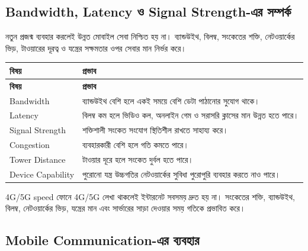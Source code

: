 \subsection{Bandwidth, Latency ও Signal Strength-এর সম্পর্ক}

নতুন প্রজন্ম ব্যবহার করলেই উন্নত মোবাইল সেবা নিশ্চিত হয় না। ব্যান্ডউইথ, বিলম্ব, সংকেতের শক্তি, নেটওয়ার্কের ভিড়, টাওয়ারের দূরত্ব ও যন্ত্রের সক্ষমতার ওপর সেবার মান নির্ভর করে।

\begingroup
\begin{longtable}{|p{}|p{}|}
\hline
\textbf{বিষয়} & \textbf{প্রভাব} \\
\hline
\endfirsthead
\hline
\textbf{বিষয়} & \textbf{প্রভাব} \\
\hline
\endhead

Bandwidth & ব্যান্ডউইথ বেশি হলে একই সময়ে বেশি ডেটা পাঠানোর সুযোগ থাকে। \\
\hline
Latency & বিলম্ব কম হলে ভিডিও কল, অনলাইন গেম ও সরাসরি ক্লাসের মান উন্নত হতে পারে। \\
\hline
Signal Strength & শক্তিশালী সংকেত সংযোগ স্থিতিশীল রাখতে সাহায্য করে। \\
\hline
Congestion & ব্যবহারকারী বেশি হলে গতি কমতে পারে। \\
\hline
Tower Distance & টাওয়ার দূরে হলে সংকেত দুর্বল হতে পারে। \\
\hline
Device Capability & পুরোনো যন্ত্র উচ্চগতির নেটওয়ার্কের সুবিধা পুরোপুরি ব্যবহার করতে নাও পারে। \\
\hline
\end{longtable}
\endgroup

\begin{mistakebox}{4G/5G speed}
ফোনে 4G/5G লেখা থাকলেই ইন্টারনেট সবসময় দ্রুত হয় না। সংকেতের শক্তি, ব্যান্ডউইথ, বিলম্ব, নেটওয়ার্কের ভিড়, যন্ত্রের মান এবং সার্ভারের সাড়া দেওয়ার সময় গতিকে প্রভাবিত করে।
\end{mistakebox}

\subsection{Mobile Communication-এর ব্যবহার}

